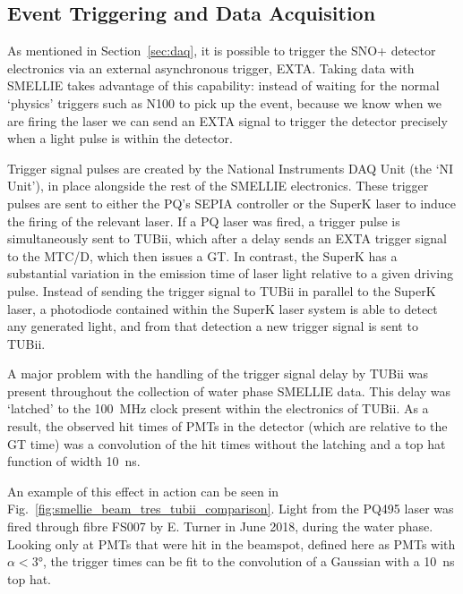 \subsection{Event Triggering and Data Acquisition}\label{sec:smellie_triggering_daq}
As mentioned in Section~\ref{sec:daq}, it is possible to trigger the SNO+ detector electronics via an external asynchronous trigger, EXTA. Taking data with SMELLIE takes advantage of this capability: instead of waiting for the normal `physics' triggers such as N100 to pick up the event, because we know when we are firing the laser we can send an EXTA signal to trigger the detector precisely when a light pulse is within the detector.

Trigger signal pulses are created by the National Instruments DAQ Unit (the `NI Unit'), in place alongside the rest of the SMELLIE electronics. These trigger pulses are sent to either the PQ's SEPIA controller or the SuperK laser to induce the firing of the relevant laser. If a PQ laser was fired, a trigger pulse is simultaneously sent to TUBii, which after a delay sends an EXTA trigger signal to the MTC/D, which then issues a GT. In contrast, the SuperK has a substantial variation in the emission time of laser light relative to a given driving pulse. Instead of sending the trigger signal to TUBii in parallel to the SuperK laser, a photodiode contained within the SuperK laser system is able to detect any generated light, and from that detection a new trigger signal is sent to TUBii.

A major problem with the handling of the trigger signal delay by TUBii was present throughout the collection of water phase SMELLIE data. This delay was `latched' to the \SI{100}{\MHz} clock present within the electronics of TUBii. As a result, the observed hit times of PMTs in the detector (which are relative to the GT time) was a convolution of the hit times without the latching and a top hat function of width \SI{10}{\ns}.

An example of this effect in action can be seen in Fig.~\ref{fig:smellie_beam_tres_tubii_comparison}. Light from the PQ495 laser was fired through fibre FS007 by E. Turner in June 2018, during the water phase. Looking only at PMTs that were hit in the beamspot, defined here as PMTs with $\alpha<\ang{3}$, the trigger times can be fit to the convolution of a Gaussian with a \SI{10}{\ns} top hat.

